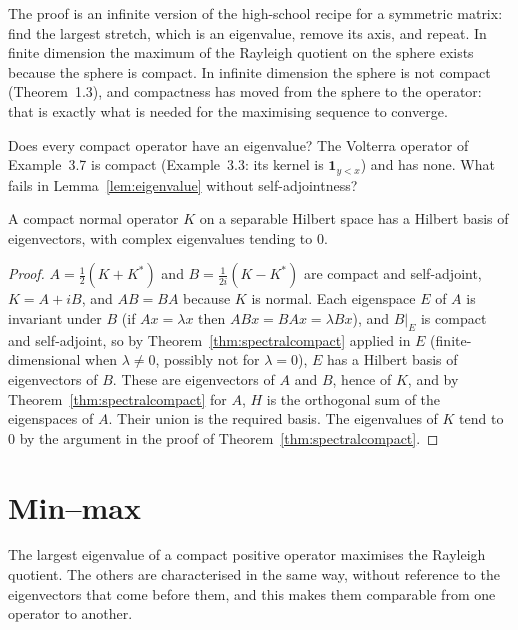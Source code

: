 \begin{beauty}
The proof is an infinite version of the high-school recipe for a symmetric matrix: find the largest stretch, which is an eigenvalue,
remove its axis, and repeat. In finite dimension the maximum of the Rayleigh quotient on the sphere exists because the sphere is compact.
In infinite dimension the sphere is not compact (Theorem~1.3), and compactness has moved from the sphere to the operator: that is
exactly what is needed for the maximising sequence to converge.
\end{beauty}

\begin{think}
Does every compact operator have an eigenvalue? The Volterra operator of Example~3.7 is compact (Example~3.3: its kernel is $\mathbf 1_{y<x}$) and has none. What fails in Lemma~\ref{lem:eigenvalue}
without self-adjointness?
\end{think}

\begin{corollary}\label{cor:normal}
A compact normal operator $K$ on a separable Hilbert space has a Hilbert basis of eigenvectors, with complex eigenvalues tending to $0$.
\end{corollary}
\begin{proof}
$A=\frac12(K+K^*)$ and $B=\frac1{2i}(K-K^*)$ are compact and self-adjoint, $K=A+iB$, and $AB=BA$ because $K$ is normal. Each eigenspace $E$ of $A$ is invariant under $B$ (if $Ax=\lambda x$ then $ABx=BAx=\lambda Bx$), and $B|_E$ is compact
and self-adjoint, so by Theorem~\ref{thm:spectralcompact} applied in $E$ (finite-dimensional when $\lambda\ne0$, possibly not for $\lambda=0$), $E$ has a Hilbert basis of eigenvectors of $B$. These are eigenvectors of $A$ and $B$, hence of
$K$, and by Theorem~\ref{thm:spectralcompact} for $A$, $H$ is the orthogonal sum of the eigenspaces of $A$. Their union is the required basis. The eigenvalues of $K$ tend to $0$ by the argument in the proof of
Theorem~\ref{thm:spectralcompact}.
\end{proof}

\section{Min--max}

The largest eigenvalue of a compact positive operator maximises the Rayleigh quotient. The others are characterised in the same way, without
reference to the eigenvectors that come before them, and this makes them comparable from one operator to another.

